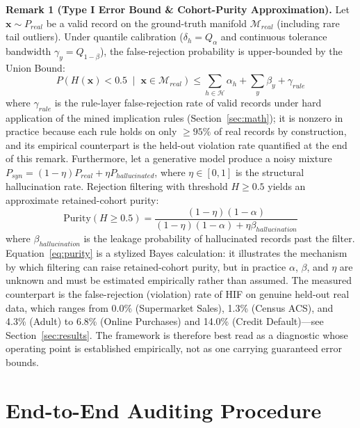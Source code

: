 \textbf{Remark 1 (Type I Error Bound \& Cohort-Purity Approximation).} Let $\mathbf{x} \sim P_{real}$ be a valid record on the ground-truth manifold $\mathcal{M}_{real}$ (including rare tail outliers). Under quantile calibration ($\delta_h = Q_{\alpha}$ and continuous tolerance bandwidth $\gamma_y = Q_{1-\beta}$), the false-rejection probability is upper-bounded by the Union Bound:
\begin{equation}
    P\left( H(\mathbf{x}) < 0.5 \;\middle|\; \mathbf{x} \in \mathcal{M}_{real} \right) \le \sum_{h \in \mathcal{H}} \alpha_h + \sum_{y} \beta_y + \gamma_{rule}
\end{equation}
where $\gamma_{rule}$ is the rule-layer false-rejection rate of valid records under hard application of the mined implication rules (Section~\ref{sec:math}); it is nonzero in practice because each rule holds on only $\ge 95\%$ of real records by construction, and its empirical counterpart is the held-out violation rate quantified at the end of this remark.
Furthermore, let a generative model produce a noisy mixture $P_{syn} = (1 - \eta) P_{real} + \eta P_{hallucinated}$, where $\eta \in [0, 1]$ is the structural hallucination rate. Rejection filtering with threshold $H \ge 0.5$ yields an approximate retained-cohort purity:
\begin{equation}
    \text{Purity}(H \ge 0.5) = \frac{(1 - \eta)(1 - \alpha)}{(1 - \eta)(1 - \alpha) + \eta \beta_{hallucination}}
    \label{eq:purity}
\end{equation}
where $\beta_{hallucination}$ is the leakage probability of hallucinated records past the filter. Equation~\eqref{eq:purity} is a stylized Bayes calculation: it illustrates the mechanism by which filtering can raise retained-cohort purity, but in practice $\alpha$, $\beta$, and $\eta$ are unknown and must be estimated empirically rather than assumed. The measured counterpart is the false-rejection (violation) rate of HIF on genuine held-out real data, which ranges from 0.0\% (Supermarket Sales), 1.3\% (Census ACS), and 4.3\% (Adult) to 6.8\% (Online Purchases) and 14.0\% (Credit Default)---see Section~\ref{sec:results}. The framework is therefore best read as a diagnostic whose operating point is established empirically, not as one carrying guaranteed error bounds.

\section{End-to-End Auditing Procedure}\label{app:calibration}

